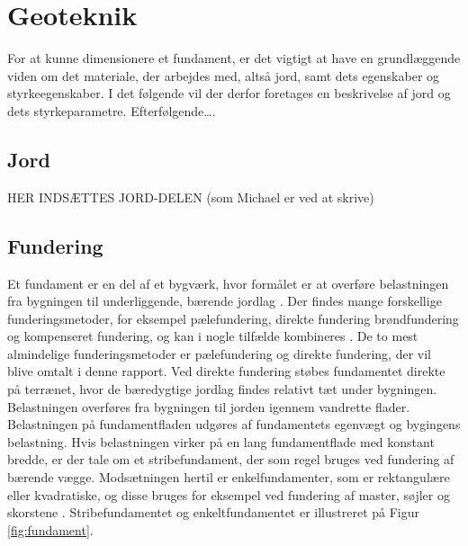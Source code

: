 \chapter{Geoteknik}

For at kunne dimensionere et fundament, er det vigtigt at have en grundlæggende viden om det materiale, der arbejdes med, altså jord, samt dets egenskaber og styrkeegenskaber. I det følgende vil der derfor foretages en beskrivelse af jord og dets styrkeparametre.
\newline \indent{     }  Efterfølgende….

\section{Jord}

HER INDSÆTTES JORD-DELEN (som Michael er ved at skrive)

\section{Fundering}
Et fundament er en del af et bygværk, hvor formålet er at overføre belastningen fra bygningen til underliggende, bærende jordlag \citep[ s. 221]{geoteknik}. Der findes mange forskellige funderingsmetoder, for eksempel pælefundering, direkte fundering brøndfundering og kompenseret fundering, og kan i nogle tilfælde kombineres \citep{fundering}. De to mest almindelige funderingsmetoder er pælefundering og direkte fundering, der vil blive omtalt i denne rapport. 
\newline \indent{     }  Ved direkte fundering støbes fundamentet direkte på terrænet, hvor de bæredygtige jordlag findes relativt tæt under bygningen. Belastningen overføres fra bygningen til jorden igennem vandrette flader. Belastningen på fundamentfladen udgøres af fundamentets egenvægt og bygingens belastning. Hvis belastningen virker på en lang fundamentflade med konstant bredde, er der tale om et stribefundament, der som regel bruges ved fundering af bærende vægge. Modsætningen hertil er enkelfundamenter, som er rektangulære eller kvadratiske, og disse bruges for eksempel ved fundering af master, søjler og skorstene \citep[ s. 221]{geoteknik}. Stribefundamentet og enkeltfundamentet er illustreret på Figur \ref{fig:fundament}. 

